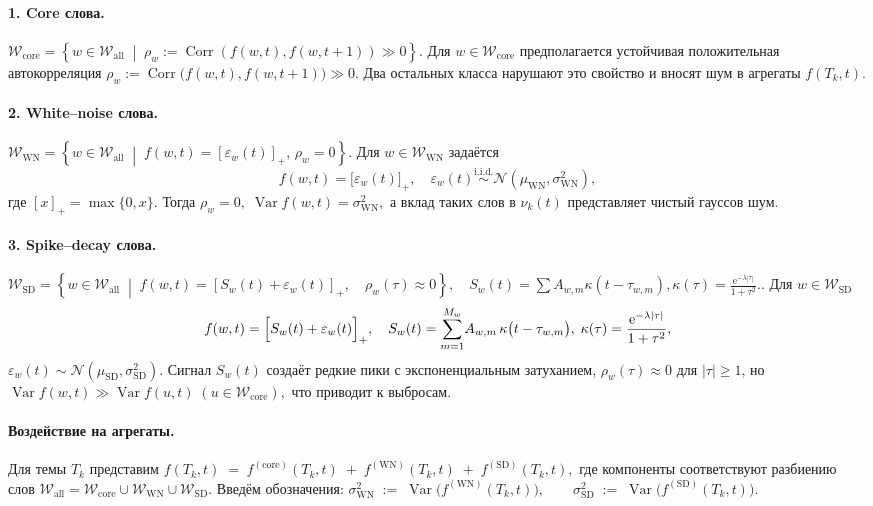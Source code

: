 \documentclass[14pt,a4paper]{article}
\begin{document}
\paragraph{1. Core слова.}
\(
\mathcal{W}_{\mathrm{core}} = \left\{ w \in \mathcal{W}_{\mathrm{all}} \;\middle|\; \rho_w := \operatorname{Corr}(f(w,t), f(w,t{+}1)) \gg 0 \right\}
\).
Для $w\in\mathcal{W}_{\mathrm{core}}$ предполагается устойчивая положительная автокорреляция  
\(
  \rho_{w}:=\operatorname{Corr}\bigl(f(w,t),f(w,t+1)\bigr)\gg 0.
\)
Два остальных класса нарушают это свойство и вносят шум в агрегаты $f(T_k,t)$.

\paragraph{2. White–noise слова.}
\(
\mathcal{W}_{\mathrm{WN}}   = \left\{ w \in \mathcal{W}_{\mathrm{all}} \;\middle|\; f(w,t) = [\varepsilon_w(t)]_+,\, \rho_w = 0 \right\}
\).
Для $w\in\mathcal{W}_{\mathrm{WN}}$ задаётся
\[
  f(w,t)=\bigl[\varepsilon_w(t)\bigr]_+, 
  \quad 
  \varepsilon_w(t)\overset{\text{i.i.d.}}{\sim}\mathcal N(\mu_{\mathrm{WN}},\sigma_{\mathrm{WN}}^{2}),
\]
где $[x]_+=\max\{0,x\}$.  
Тогда
\(
  \rho_{w}=0,\;
  \operatorname{Var}\!f(w,t)=\sigma_{\mathrm{WN}}^{2},
\)
а вклад таких слов в $\nu_k(t)$ представляет чистый гауссов шум.

\paragraph{3. Spike–decay слова.}
\(
\mathcal{W}_{\mathrm{SD}}   = \left\{ w \in \mathcal{W}_{\mathrm{all}} \;\middle|\; f(w,t) = [S_w(t) + \varepsilon_w(t)]_+, \quad \rho_w(\tau) \approx 0\right\},
\quad S_w(t) = \textstyle\sum A_{w,m} \kappa(t{-}\tau_{w,m}),  \kappa(\tau)=\frac{\mathrm e^{-\lambda|\tau|}}{1+\tau^{2}}.
\).
Для $w\in\mathcal{W}_{\mathrm{SD}}$
\[
  f(w,t)=\Bigl[S_w(t)+\varepsilon_w(t)\Bigr]_+,
  \quad
  S_w(t)=\sum_{m=1}^{M_w}\!A_{w,m}\,
  \kappa\bigl(t-\tau_{w,m}\bigr),\;
  \kappa(\tau)=\frac{\mathrm e^{-\lambda|\tau|}}{1+\tau^{2}},
\]
\(
  \varepsilon_w(t)\sim\mathcal N(\mu_{\mathrm{SD}},\sigma_{\mathrm{SD}}^{2}).
\)
Сигнал $S_w(t)$ создаёт редкие пики с экспоненциальным затуханием,  
\(
  \rho_{w}(\tau)\approx 0
\)
для $|\tau|\ge1$, но  
\(
  \operatorname{Var}\!f(w,t)\gg \operatorname{Var}\!f(u,t)\;(u\in\mathcal{W}_{\mathrm{core}}),
\)
что приводит к выбросам.

\paragraph{Воздействие на агрегаты.}  
Для темы \(T_k\) представим
\(
  f(T_k,t)
  \;=\;
  f^{(\mathrm{core})}(T_k,t)
  \;+\;
  f^{(\mathrm{WN})}(T_k,t)
  \;+\;
  f^{(\mathrm{SD})}(T_k,t),
\)
где компоненты соответствуют разбиению слов \(\mathcal{W}_{\mathrm{all}} = \mathcal{W}_{\mathrm{core}} \cup \mathcal{W}_{\mathrm{WN}} \cup \mathcal{W}_{\mathrm{SD}}\). 
Введём обозначения:
\(
  \sigma_{\mathrm{WN}}^{2} \;:=\; \operatorname{Var}\bigl(f^{(\mathrm{WN})}(T_k,t)\bigr),
  \qquad
  \sigma_{\mathrm{SD}}^{2} \;:=\; \operatorname{Var}\bigl(f^{(\mathrm{SD})}(T_k,t)\bigr).
\)
\end{document}
